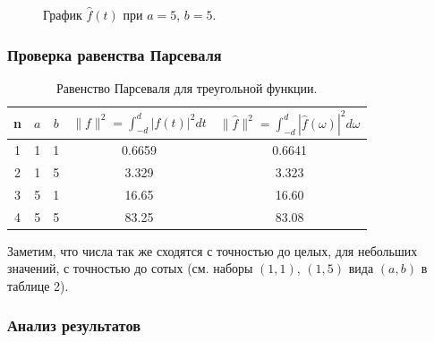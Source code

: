 \documentclass[a5paper, 10pt]{article}
\theoremstyle{definition}
\theoremstyle{plain}
\theoremstyle{remark}
\begin{document}
\begin{figure}[h!]
\caption{График $\hat{f}(t)$ при $a = 5$, $b = 5$.}
\end{figure}




\subsubsection{Проверка равенства Парсеваля}

\begin{table}[h!]
\caption{Равенство Парсеваля для треугольной функции.}
\label{tabular:timesandtenses}
\begin{center}
\begin{tabular}{|c|c|c|c|c|}
\hline
n & $a$ & $b$ & $\| f \|^2 = \int_{-d}^d |f(t)|^2 dt $ & $\| \hat{f} \|^2 = \int_{-d}^d |\hat{f}(\omega)|^2 d\omega $ \\
\hline
1 & 1 & 1 &  0.6659& 0.6641\\
\hline
2 & 1 & 5 & 3.329  & 3.323\\
\hline
3 & 5 & 1 & 16.65 &  16.60\\
\hline
4 & 5 & 5 & 83.25 & 83.08 \\
\hline
\end{tabular}
\end{center}
\end{table}

Заметим, что числа так же сходятся с точностью до целых, для небольших значений, с точностью до сотых (см. наборы $(1, 1)$, $(1, 5)$ вида $(a, b)$ в таблице 2).

\newpage
\subsubsection{Анализ результатов}
\end{document}
